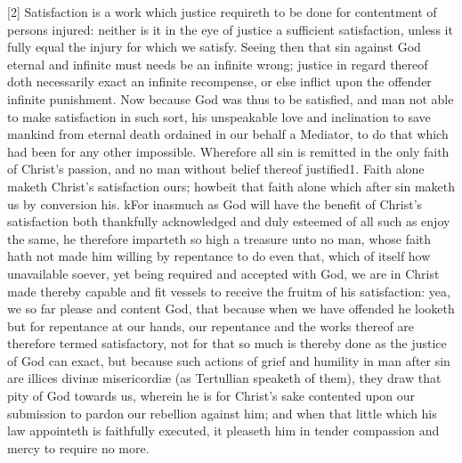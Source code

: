 [2] Satisfaction is a work which justice requireth to be done for contentment of persons injured: neither is it in the eye of justice a sufficient satisfaction, unless it fully equal the injury for which we satisfy. Seeing then that sin against God eternal and infinite must needs be an infinite wrong; justice in regard thereof doth necessarily exact an infinite recompense, or else inflict upon the offender infinite punishment. Now because God was thus to be satisfied, and man not able to make satisfaction in such sort, his unspeakable love and inclination to save mankind from eternal death ordained in our behalf a Mediator, to do that which had been for any other impossible. Wherefore all sin is remitted in  the only faith of Christ’s passion, and no man without belief thereof justified1. Faith alone maketh Christ’s satisfaction ours; howbeit that faith alone which after sin maketh us by conversion his. kFor inasmuch as God will have the benefit of Christ’s satisfaction both thankfully acknowledged and duly esteemed of all such as enjoy the same, he therefore imparteth so high a treasure unto no man, whose faith hath not made him willing by repentance to do even that, which of itself how unavailable soever, yet being required and accepted with God, we are in Christ made thereby capable and fit vessels to receive the fruitm of his satisfaction: yea, we so far please and content God, that because when we have offended he looketh but for repentance at our hands, our repentance and the works thereof are therefore termed satisfactory, not for that so much is thereby done as the justice of God can exact, but because such actions of grief and humility in man after sin are illices divinæ misericordiæ (as Tertullian speaketh of them), they draw that pity of God towards us, wherein he is for Christ’s sake contented upon our submission to pardon our rebellion against him; and when that little which his law appointeth is faithfully executed, it pleaseth him in tender compassion and mercy to require no more.

